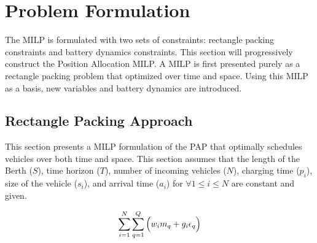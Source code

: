 \documentclass[letterpaper, 10pt, conference]{IEEEtran}
\begin{document}
%

% 
\section{Problem Formulation}
\label{sec:problemformulation}
The MILP is formulated with two sets of constraints: rectangle packing constraints and battery dynamics constraints. This section will progressively construct the Position Allocation MILP. A MILP is first presented purely as a rectangle packing problem that optimized over time and space. Using this MILP as a basis, new variables and battery dynamics are introduced.

\subsection{Rectangle Packing Approach}
This section presents a MILP formulation of the PAP that optimally schedules vehicles over both time and space. This section assumes that the length of the Berth ($S$), time horizon ($T$), number of incoming vehicles ($N$), charging time ($p_i$), size of the vehicle ($s_i$), and arrival time ($a_i$) for $\forall 1 \leq i \leq N$ are constant and given.

\begin{equation}\label{eq:objective}
    \sum_{i=1}^N \sum_{q=1}^Q \Big( w_i m_q + g_i \epsilon_q \Big) \\
\end{equation}
\end{document}
